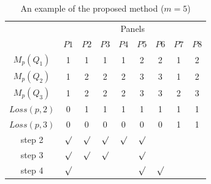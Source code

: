\documentclass[conference]{IEEEtran}
\begin{document}
\begin{table}[t]
\caption{An example of the proposed method ($m = 5$)}
\begin{center}
\begin{tabular}{c|cccccccc}\hline \hline
                               & \multicolumn{8}{c}{Panels}  \\
                               &  \multicolumn{1}{c}{$P1$}    & $P2$   & $P3$    & $P4$    & $P5$   & \multicolumn{1}{c}{$P6$}            & $P7$ & $P8$             \\ \hline
$M_{p}(Q_1)$        & 1     & 1     & 1     & 1     & 2    & 2  & 1  & 2              \\ \hline
$M_{p}(Q_2)$        & 1     & 2     & 2     & 2     & 3    & 3  & 1  & 2              \\ \hline
$M_{p}(Q_3)$        & 1     & 2     & 2     & 2     & 3    & 3  & 2  & 3              \\ \hline
$Loss(p,2)$           & 0     & 1     & 1     & 1     & 1    & 1  & 1  & 1    \\ \hline
$Loss(p,3)$           & 0     & 0     & 0     & 0     & 0    & 0  & 1  & 1    \\ \hline\hline
step 2        & $\surd$ & $\surd$ &$\surd$ &$\surd$ &$\surd$ & & & \\ \hline
step 3      & $\surd$ & $\surd$ &$\surd$ & &$\surd$ & & & \\ \hline
step 4       & $\surd$ &  & & &$\surd$ & $\surd$ & & \\ \hline         
\end{tabular}
\end{center}
\label{tab:proposed-example}
\end{table}


\end{document}
